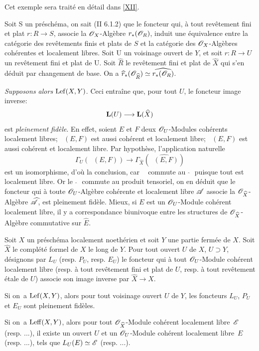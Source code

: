 Cet exemple sera trait\'e en d\'etail dans \Exp \ref{XII}.

Soit S un pr\'esch\'ema, on sait (\EGA II 6.1.2) que le foncteur qui, \`a tout rev\^etement fini et plat $r\colon R\to S$, associe la $\mathscr{O}_X$-Alg\`ebre $r_\ast({\mathscr O}_R)$, induit une \'equivalence entre la cat\'egorie des rev\^etements finis et plats de $S$ et la cat\'egorie des $\mathscr{O}_X$-Alg\`ebres coh\'erentes et localement libres. Soit U un voisinage ouvert de $Y$, et soit $r\colon R\to U$ un rev\^etement fini et plat de U. Soit $\hat{R}$ le rev\^etement fini et plat de $\hat{X}$ qui s'en d\'eduit par changement de base. On a $\widehat{r}_\ast({\mathscr O}_{\widehat{R}})\simeq\widehat{r_\ast({\mathscr O}_R)}$.

\emph{Supposons alors} $\operatorname{Lef}(X, Y)$. Ceci entra\^ine que, pour tout $U$, le foncteur image inverse:
\[
\LL(U) \to \LL(\hat{X})
\]
est \emph{pleinement fidèle}. En effet, soient $E$ et $F$ deux ${\mathscr O}_U$-Modules coh\'erents localement libres; $\mathop{\underline{\mathrm{Hom}}}\nolimits(E, F)$ est aussi coh\'erent et localement libre; $\mathop{\underline{\mathrm{Hom}}}\nolimits(E, F)$ est aussi coh\'erent et localement libre. Par hypoth\`ese, l'application naturelle
\[
\Gamma_U (\mathop{\underline{\mathrm{Hom}}}\nolimits(E, F)) \to \Gamma_{\hat{X}}(\widehat{\mathop{\underline{\mathrm{Hom}}}\nolimits(E, F)})
\]
est un isomorphisme, d'o\`u la conclusion, car $\mathop{\underline{\mathrm{Hom}}}\nolimits$ commute au $\, \, \hat{}\, \, $ puisque tout est localement libre. Or le $\, \, \hat{}\, \, $ commute au produit tensoriel, on en d\'eduit que le foncteur qui \`a toute ${\mathscr O}_U$-Alg\`ebre coh\'erente et localement libre ${\mathscr A}$ associe la ${\mathscr O}_{\widehat{X}}$-Alg\`ebre $\widehat{{\mathscr A}}$, est pleinement fid\`ele. Mieux, si $E$ est un ${\mathscr O}_U$-Module coh\'erent localement libre, il y a correspondance biunivoque entre les structures de ${\mathscr O}_{\widehat{X}}$-Alg\`ebre commutative sur $\hat{E}$.

\begin{proposition} \label{X.2.3}
Soit $X$ un pr\'esch\'ema localement noeth\'erien et soit $Y$ une partie ferm\'ee de $X$. Soit $\hat{X}$ le compl\'et\'e formel de $X$ le long de $Y$. Pour tout ouvert $U$ de $X$, $U\supset Y$, d\'esignons par $L_U$ (resp. $P_U$, resp. $E_U$) le foncteur qui \`a tout ${\mathscr O}_U$-Module coh\'erent localement libre (resp. \`a tout rev\^etement fini et plat de $U$, resp. \`a tout rev\^etement \'etale de $U$) associe son image inverse par $\hat{X} \to X$.
\begin{enumeratei}
\item
Si on~a $\operatorname{Lef}(X, Y)$, alors pour tout voisinage ouvert $U$ de $Y$, les foncteurs $L_U$, $P_U$ et $E_U$ sont pleinement fid\`eles.

\item
Si on~a $\operatorname{Leff}(X, Y)$, alors pour tout ${\mathscr O}_{\widehat{X}}$-Module coh\'erent localement libre~${\mathscr E}$ (resp. ...), il existe un ouvert $U$ et un ${\mathscr O}_U$-Module coh\'erent localement libre~$E$ (resp. ...), tels que $L_U(E) \simeq {\mathscr E}$ (resp. ...).
\end{enumeratei}
\end{proposition}

